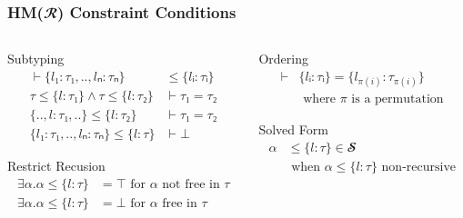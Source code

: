 \documentclass[aspectratio=169]{beamer}
\begin{document}
\endgroup
\begin{frame}[fragile]
  \frametitle{HM($𝓡$) Constraint Conditions}
  \begin{columns}
    \begin{column}{0.5\textwidth}
      \begin{block}{Subtyping}
        \setlength\abovedisplayskip{0pt}
        \begin{align*}
          ⊢ \{l₁ : τ₁, .., lₙ : τₙ\}           & ≤ \{lᵢ : τᵢ\} \\
          τ ≤ \{l : τ₁\} ∧ τ ≤ \{l : τ₂\}      & ⊢ τ₁ = τ₂     \\
          \{.., l : τ₁, ..\} ≤ \{l : τ₂\}      & ⊢ τ₁ = τ₂     \\
          \{l₁ : τ₁, .., lₙ : τₙ\} ≤ \{l : τ\} & ⊢ ⊥
        \end{align*}
      \end{block}
      \begin{block}{Restrict Recusion}
        \setlength\abovedisplayskip{0pt}
        \begin{align*}
          ∃α. α ≤ \{l : τ\} & = ⊤ \text{ for } α \text{ not free in } τ \\
          ∃α. α ≤ \{l : τ\} & = ⊥ \text{ for } α \text{ free in } τ
        \end{align*}
      \end{block}
    \end{column}
    \begin{column}{0.4\textwidth}
      \begin{block}{Ordering}
        \setlength\abovedisplayskip{0pt}
        \begin{align*}
          ⊢ & \{lᵢ : τᵢ\} = \{l_{π(i)} : τ_{π(i)}\}   \\
            & \text{ where } π \text{ is a permutation}
        \end{align*}
      \end{block}
      \begin{block}{Solved Form}
        \setlength\abovedisplayskip{0pt}
        \begin{align*}
          α &≤ \{l : τ\} ∈ 𝓢 \\ 
          & \text{ when } α ≤ \{l : τ\} \text{ non-recursive}
        \end{align*}
      \end{block}
    \end{column}
  \end{columns}
\end{frame}
\end{document}
